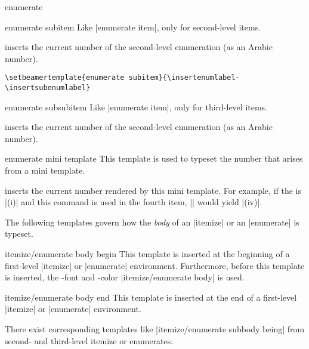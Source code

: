 \begin{environment}{{enumerate}}
  \begin{element}{enumerate subitem}\yes\yes\yes
    Like |enumerate item|, only for second-level items. 

    \begin{templateinserts}
      \iteminsert{\insertsubenumlabel}
      inserts the current number of the second-level enumeration (as an
      Arabic number). 
    \end{templateinserts}

    \example
\begin{verbatim}
\setbeamertemplate{enumerate subitem}{\insertenumlabel-\insertsubenumlabel}
\end{verbatim}
  \end{element}

  \begin{element}{enumerate subsubitem}\yes\yes\yes
    Like |enumerate item|, only for third-level items. 

    \begin{templateinserts}
      \iteminsert{\insertsubsubenumlabel}
      inserts the current number of the second-level enumeration (as an
      Arabic number). 
    \end{templateinserts}
  \end{element}

  \begin{element}{enumerate mini template}\yes\yes\yes
    This template is used to typeset the number that arises from a
    mini template.

    \begin{templateinserts}
      \iteminsert{\insertenumlabel}
      inserts the current number rendered by this mini template. For
      example, if the  is |(i)| and this command
      is used in the fourth item, |\insertenumlabel| would yield
      |(iv)|.
    \end{templateinserts}
  \end{element}
\end{environment}

The following templates govern how the \emph{body} of an |itemize| or
an |enumerate| is typeset.
\begin{element}{itemize/enumerate body begin}\yes\no\no
  This template is inserted at the beginning of a first-level
  |itemize| or |enumerate| environment. Furthermore, before this
  template is inserted, the \beamer-font and -color
  |itemize/enumerate body| is used.
\end{element}
\begin{element}{itemize/enumerate body end}\yes\no\no
  This template is inserted at the end of a first-level
  |itemize| or |enumerate| environment.
\end{element}
There exist corresponding templates like
|itemize/enumerate subbody being| from second- and third-level itemize
or enumerates.

